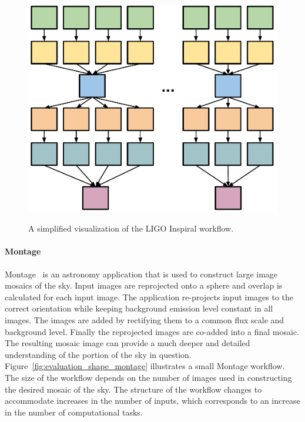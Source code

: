 \begin{figure}[!htb]
	\centering
	\includegraphics[width=0.6\linewidth]{figure14.pdf} \\
	\caption{A simplified visualization of the LIGO Inspiral workflow.}
	\label{fig:evaluation_shape_ligo}
\end{figure}

\paragraph{\textbf{Montage}}
Montage~\cite{Berriman2004} is an astronomy application that is used to construct large image mosaics of the sky. Input images are reprojected onto a sphere and overlap is calculated for each input image. The application re-projects input images to the correct orientation while keeping background emission level constant in all images. The images are added by rectifying them to a common flux scale and background level. Finally the reprojected images are co-added into a final mosaic. The resulting mosaic image can provide a much deeper and detailed understanding of the portion of the sky in question. Figure~\ref{fig:evaluation_shape_montage} illustrates a small Montage workflow. The size of the workflow depends on the number of images used in constructing the desired mosaic of the sky. The structure of the workflow changes to accommodate increases in the number of inputs, which corresponds to an increase in the number of computational tasks.

